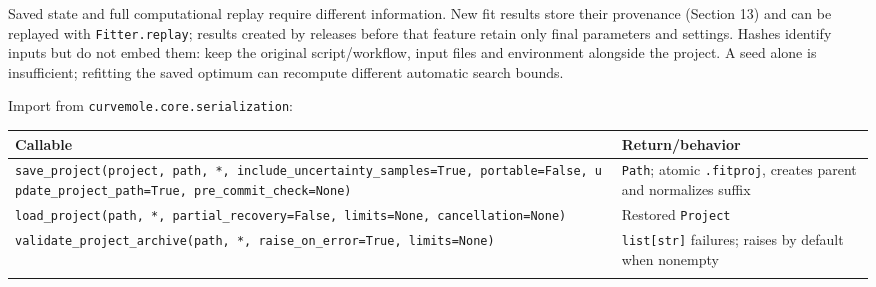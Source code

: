 \documentclass[
  10pt,
  a4paper,
  oneside]{scrreprt}
\begin{document}
Saved state and full computational replay require different information.
New fit results store their provenance (Section 13) and can be replayed
with \texttt{Fitter.replay}; results created by releases before that
feature retain only final parameters and settings. Hashes identify
inputs but do not embed them: keep the original script/workflow, input
files and environment alongside the project. A seed alone is
insufficient; refitting the saved optimum can recompute different
automatic search bounds.

Import from \texttt{curvemole.core.serialization}:

\begin{longtable}[]{@{}ll@{}}
\toprule
\begin{minipage}[b]{0.47\columnwidth}\raggedright
Callable\strut
\end{minipage} & \begin{minipage}[b]{0.47\columnwidth}\raggedright
Return/behavior\strut
\end{minipage}\tabularnewline
\midrule
\endhead
\begin{minipage}[t]{0.47\columnwidth}\raggedright
\texttt{save\_project(project,\ path,\ *,\ include\_uncertainty\_samples=True,\ portable=False,\ update\_project\_path=True,\ pre\_commit\_check=None)}\strut
\end{minipage} & \begin{minipage}[t]{0.47\columnwidth}\raggedright
\texttt{Path}; atomic \texttt{.fitproj}, creates parent and normalizes
suffix\strut
\end{minipage}\tabularnewline
\begin{minipage}[t]{0.47\columnwidth}\raggedright
\texttt{load\_project(path,\ *,\ partial\_recovery=False,\ limits=None,\ cancellation=None)}\strut
\end{minipage} & \begin{minipage}[t]{0.47\columnwidth}\raggedright
Restored \texttt{Project}\strut
\end{minipage}\tabularnewline
\begin{minipage}[t]{0.47\columnwidth}\raggedright
\texttt{validate\_project\_archive(path,\ *,\ raise\_on\_error=True,\ limits=None)}\strut
\end{minipage} & \begin{minipage}[t]{0.47\columnwidth}\raggedright
\texttt{list{[}str{]}} failures; raises by default when nonempty\strut
\end{minipage}\tabularnewline
\begin{minipage}[t]{0.47\columnwidth}\raggedright

\end{minipage}
\end{longtable}
\end{document}
